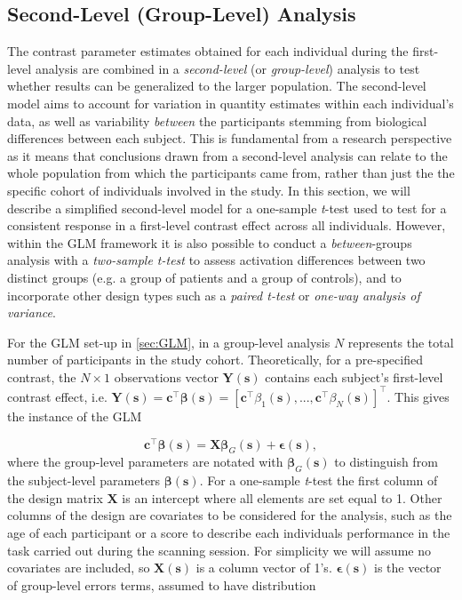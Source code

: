 \subsection{Second-Level (Group-Level) Analysis}
\label{sec:group_level}

The contrast parameter estimates obtained for each individual during the first-level analysis are combined in a \textit{second-level} (or \textit{group-level}) analysis to test whether results can be generalized to the larger population. The second-level model aims to account for variation in quantity estimates within each individual's data, as well as variability \textit{between} the participants stemming from biological differences between each subject.  This is fundamental from a research perspective as it means that conclusions drawn from a second-level analysis can relate to the whole population from which the participants came from, rather than just the the specific cohort of individuals involved in the study. In this section, we will describe a simplified second-level model for a one-sample \textit{t}-test used to test for a consistent response in a first-level contrast effect across all individuals. However, within the GLM framework it is also possible to conduct a \textit{between}-groups analysis with a \textit{two-sample t-test} to assess activation differences between two distinct groups (e.g. a group of patients and a group of controls), and to incorporate other design types such as a \textit{paired t-test} or \textit{one-way analysis of variance}.   

For the GLM set-up in \ref{sec:GLM}, in a group-level analysis $N$ represents the total number of participants in the study cohort. Theoretically, for a pre-specified contrast, the $N \times 1$ observations vector $\bm{Y}(\bm{s})$ contains each subject's first-level contrast effect, i.e. $\bm{Y}(\bm{s}) = \bm{c}^{\intercal}\bm{\beta}(\bm{s}) = [\bm{c}^{\intercal}\beta_{1}(\bm{s}), ..., \bm{c}^{\intercal}\beta_{N}(\bm{s})]^{\intercal}$. This gives the instance of the GLM 

\begin{equation}
\label{eq:theoretical_group_GLM}
\bm{c}^{\intercal}\bm{\beta}(\bm{s}) = \bm{X}\bm{\beta}_{G}(\bm{s}) + \bm{\epsilon}(\bm{s}),
\end{equation}
where the group-level parameters are notated with $\bm{\beta}_{G}(\bm{s})$ to distinguish from the subject-level parameters $\bm{\beta}(\bm{s})$. For a one-sample \textit{t}-test the first column of the design matrix $\bm{X}$ is an intercept where all elements are set equal to 1. Other columns of the design are covariates to be considered for the analysis, such as the age of each participant or a score to describe each individuals performance in the task carried out during the scanning session. For simplicity we will assume no covariates are included, so $\bm{X}(\bm{s})$ is a column vector of 1's. $\bm{\epsilon}(\bm{s})$ is the vector of group-level errors terms, assumed to have distribution

